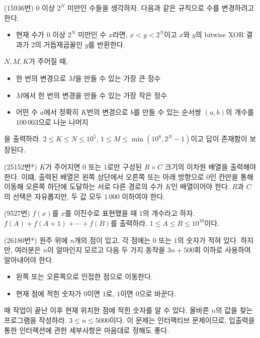 \begin{problem}
    (15936번) $0$ 이상 $2^N$ 미만인 수들을 생각하자. 다음과 같은 규칙으로 수를 변경하려고 한다.
    \begin{itemize}
        \item 현재 수가 $0$ 이상 $2^N$ 미만인 수 $x$라면, $x < y < 2^N$이고 $x$와 $y$의 bitwise XOR 결과가 2의 거듭제곱꼴인 $y$를 반환한다.
    \end{itemize}
    $N, M, K$가 주어질 때,
    \begin{itemize}
        \item 한 번의 변경으로 $M$을 만들 수 있는 가장 큰 정수
        \item $M$에서 한 번의 변경을 만들 수 있는 가장 작은 정수
        \item 어떤 수 $a$에서 정확히 $K$번의 변경으로 $b$를 만들 수 있는 순서쌍 $(a, b)$의 개수를 $100\,003$으로 나눈 나머지
    \end{itemize}
    을 출력하라. $2 \leq K \leq N \leq 10^5$, $1 \leq M \leq \min(10^8, 2^N-1)$이고 답이 존재함이 보장된다.
\end{problem}

\begin{problem}
    (25152번*) $K$가 주어지면 $0$ 또는 $1$로만 구성된 $R \times C$ 크기의 이차원 배열을 출력해야 한다. 이떄, 출력된 배열은 왼쪽 상단에서 오른쪽 또는 아래 방향으로 $0$인 칸만을 통해 이동해 오른쪽 하단에 도달하는 서로 다른 경로의 수가 $K$인 배열이어야 한다. $R$과 $C$의 선택은 자유롭지만, 두 값 모두 $1\,000$ 이하여야 한다.
\end{problem}

\begin{problem}
    (9527번) $f(x)$를 $x$를 이진수로 표현했을 때 $1$의 개수라고 하자. $f(A)+f(A+1)+\cdots+f(B)$를 출력하라. $1 \leq A \leq B \leq 10^{16}$이다.
\end{problem}

\begin{problem}
    (26180번*) 원주 위에 $n$개의 점이 있고, 각 점에는 $0$ 또는 $1$의 숫자가 적혀 있다. 하지만, 여러분은 $n$이 얼마인지 모르고 다음 두 가지 동작을 $3n+500$회 이하로 사용하여 알아내어야 한다.
    \begin{itemize}
        \item 왼쪽 또는 오른쪽으로 인접한 점으로 이동한다.
        \item 현재 점에 적힌 숫자가 $0$이면 $1$로, $1$이면 $0$으로 바꾼다.
    \end{itemize}
    매 작업이 끝난 이후 현재 위치한 점에 적힌 숫자를 알 수 있다. 올바른 $n$의 값을 찾는 프로그램을 작성하라. $3 \leq n \leq 5000$이다. 이 문제는 인터랙티브 문제이므로, 입출력을 통한 인터렉션에 관한 세부사항은 마음대로 정해도 좋다.
\end{problem}

